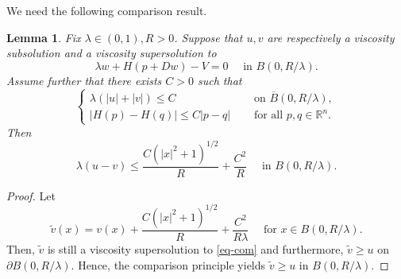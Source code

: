 \documentclass[12pt,reqno]{amsart}
\theoremstyle{plain}
\newtheorem{lem}[thm]{Lemma}
\theoremstyle{remark}
\numberwithin{equation}{section}
\newcommand{\R}{\mathbb{R}}
\newcommand{\lam}{\lambda}
\newcommand{\ol}{\overline}
\begin{document}
We need the following comparison result.

\begin{lem}\label{lem:comparison}
Fix $\lam \in (0,1), R>0$.
Suppose that $u,v$ are respectively a viscosity subsolution and a viscosity supersolution to
\begin{equation}\label{eq-com}
\lam w + H(p+Dw) - V= 0 \quad \text{ in } B(0,R/\lam).
\end{equation}
Assume further that there exists $C>0$ such that
\[
\begin{cases} 
\lam(|u|+|v|) \leq C \quad &\text{ on } \ol{B}(0,R/\lam),\\
|H(p)-H(q)| \leq C|p-q| \quad &\text{ for all } p,q \in \R^n.
\end{cases}
\]
Then
\[
\lam (u-v) \leq \frac{C (|x|^2+1)^{1/2}}{R} + \frac{C^2}{R} \quad \text{ in } B(0,R/\lam).
\]
\end{lem}

\begin{proof}
Let 
\[
\tilde v(x) = v(x) +  \frac{C (|x|^2+1)^{1/2}}{R} + \frac{C^2}{R \lam} \quad \text{ for $x\in B(0,R/\lam)$.}
\] 
Then, $\tilde v$ is still a viscosity supersolution to \eqref{eq-com} and furthermore, $\tilde v \geq u$ on $\partial B(0,R/\lam)$.
Hence, the comparison principle yields $\tilde v \geq u$ in $B(0,R/\lam)$.
\end{proof}
\end{document}
